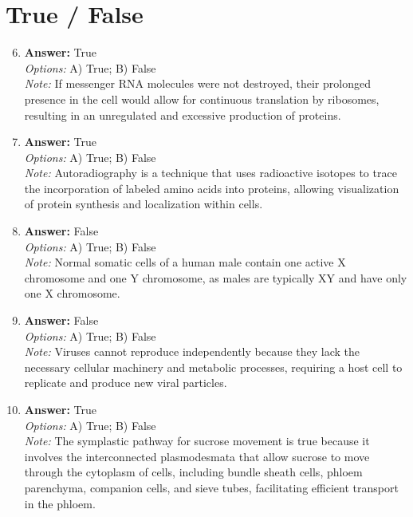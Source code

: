 \documentclass[12pt]{article}
\begin{document}
\section*{True / False}
\begin{enumerate}[label=\arabic*.]
\setcounter{enumi}{5}
\item \textbf{Answer:} True
\\ \textit{Options:} A) True; B) False
\\ \textit{Note:} If messenger RNA molecules were not destroyed, their prolonged presence in the cell would allow for continuous translation by ribosomes, resulting in an unregulated and excessive production of proteins.
\item \textbf{Answer:} True
\\ \textit{Options:} A) True; B) False
\\ \textit{Note:} Autoradiography is a technique that uses radioactive isotopes to trace the incorporation of labeled amino acids into proteins, allowing visualization of protein synthesis and localization within cells.
\item \textbf{Answer:} False
\\ \textit{Options:} A) True; B) False
\\ \textit{Note:} Normal somatic cells of a human male contain one active X chromosome and one Y chromosome, as males are typically XY and have only one X chromosome.
\item \textbf{Answer:} False
\\ \textit{Options:} A) True; B) False
\\ \textit{Note:} Viruses cannot reproduce independently because they lack the necessary cellular machinery and metabolic processes, requiring a host cell to replicate and produce new viral particles.
\item \textbf{Answer:} True
\\ \textit{Options:} A) True; B) False
\\ \textit{Note:} The symplastic pathway for sucrose movement is true because it involves the interconnected plasmodesmata that allow sucrose to move through the cytoplasm of cells, including bundle sheath cells, phloem parenchyma, companion cells, and sieve tubes, facilitating efficient transport in the phloem.
\end{enumerate}
\end{document}
